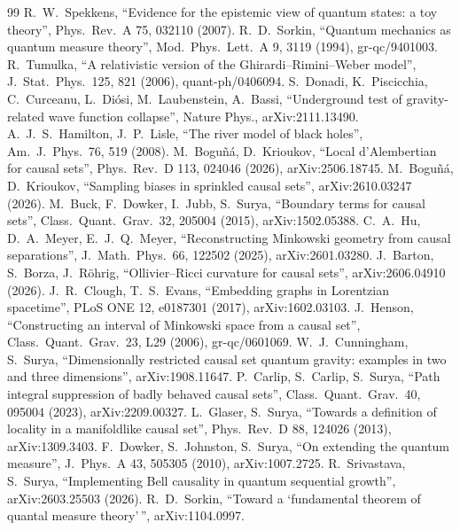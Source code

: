 \documentclass[11pt,a4paper]{article}
\begin{document}
\begin{thebibliography}{99}
 R.~W.~Spekkens, ``Evidence for the epistemic view of quantum states: a toy theory'', Phys.\ Rev.\ A 75, 032110 (2007).
 R.~D.~Sorkin, ``Quantum mechanics as quantum measure theory'', Mod.\ Phys.\ Lett.\ A 9, 3119 (1994), gr-qc/9401003.
 R.~Tumulka, ``A relativistic version of the Ghirardi--Rimini--Weber model'', J.\ Stat.\ Phys.\ 125, 821 (2006), quant-ph/0406094.
 S.~Donadi, K.~Piscicchia, C.~Curceanu, L.~Di\'osi, M.~Laubenstein, A.~Bassi, ``Underground test of gravity-related wave function collapse'', Nature Phys., arXiv:2111.13490.
 A.~J.~S.~Hamilton, J.~P.~Lisle, ``The river model of black holes'', Am.\ J.\ Phys.\ 76, 519 (2008).
 M.~Bogu\~n\'a, D.~Krioukov, ``Local d'Alembertian for causal sets'', Phys.\ Rev.\ D 113, 024046 (2026), arXiv:2506.18745.
 M.~Bogu\~n\'a, D.~Krioukov, ``Sampling biases in sprinkled causal sets'', arXiv:2610.03247 (2026).
 M.~Buck, F.~Dowker, I.~Jubb, S.~Surya, ``Boundary terms for causal sets'', Class.\ Quant.\ Grav.\ 32, 205004 (2015), arXiv:1502.05388.
 C.~A.~Hu, D.~A.~Meyer, E.~J.~Q.~Meyer, ``Reconstructing Minkowski geometry from causal separations'', J.\ Math.\ Phys.\ 66, 122502 (2025), arXiv:2601.03280.
 J.~Barton, S.~Borza, J.~R\"ohrig, ``Ollivier--Ricci curvature for causal sets'', arXiv:2606.04910 (2026).
 J.~R.~Clough, T.~S.~Evans, ``Embedding graphs in Lorentzian spacetime'', PLoS ONE 12, e0187301 (2017), arXiv:1602.03103.
 J.~Henson, ``Constructing an interval of Minkowski space from a causal set'', Class.\ Quant.\ Grav.\ 23, L29 (2006), gr-qc/0601069.
 W.~J.~Cunningham, S.~Surya, ``Dimensionally restricted causal set quantum gravity: examples in two and three dimensions'', arXiv:1908.11647.
 P.~Carlip, S.~Carlip, S.~Surya, ``Path integral suppression of badly behaved causal sets'', Class.\ Quant.\ Grav.\ 40, 095004 (2023), arXiv:2209.00327.
 L.~Glaser, S.~Surya, ``Towards a definition of locality in a manifoldlike causal set'', Phys.\ Rev.\ D 88, 124026 (2013), arXiv:1309.3403.
 F.~Dowker, S.~Johnston, S.~Surya, ``On extending the quantum measure'', J.\ Phys.\ A 43, 505305 (2010), arXiv:1007.2725.
 R.~Srivastava, S.~Surya, ``Implementing Bell causality in quantum sequential growth'', arXiv:2603.25503 (2026).
 R.~D.~Sorkin, ``Toward a `fundamental theorem of quantal measure theory'\,'', arXiv:1104.0997.

\end{thebibliography}
\end{document}
